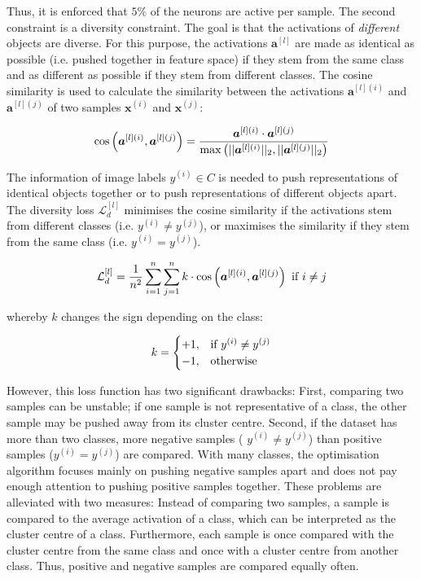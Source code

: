 Thus, it is enforced that $5\%$ of the neurons are active per sample.
The second constraint is a diversity constraint. The goal is that the activations of \emph{different} objects are diverse. For this purpose, the activations $\boldsymbol{a}^{[l]}$ are made as identical as possible (i.e. pushed together in feature space) if they stem from the same class and as different as possible if they stem from different classes.
The cosine similarity is used to calculate the similarity between the activations $\boldsymbol{a}^{[l](i)}$ and $\boldsymbol{a}^{[l](j)}$ of two samples $\boldsymbol{x}^{(i)}$ and $\boldsymbol{x}^{(j)}$:

\begin{align}\eqlbl{vso_5}
		\text{cos}\left( \boldsymbol{a}^{[l](i)}, \boldsymbol{a}^{[l](j)} \right) = \frac{\boldsymbol{a}^{[l](i)} \cdot \boldsymbol{a}^{[l](j)}}{\max \left( ||\boldsymbol{a}^{[l](i)}||_2, ||\boldsymbol{a}^{[l](j)}||_2 \right)}
\end{align}

The information of image labels $y^{(i)} \in C$ is needed to push representations of identical objects together or to push representations of different objects apart.
The diversity loss $\mathcal{L}^{[l]}_d$ minimises the cosine similarity if the activations stem from different classes (i.e. $y^{(i)} \neq y^{(j)}$), or maximises the similarity if they stem from the same class (i.e. $y^{(i)} = y^{(j)}$).

\begin{align}\eqlbl{vso_6}
		\mathcal{L}^{[l]}_{d} = \frac{1}{n^2} \sum_{i=1}^{n} \sum_{j=1}^{n} k \cdot \text{cos} \left( \boldsymbol{a}^{[l](i)}, \boldsymbol{a}^{[l](j)} \right) \text{ if } i \neq j
\end{align}

whereby $k$ changes the sign depending on the class:

\begin{align}\eqlbl{vso_7}
		k = \begin{cases}
      		+1, & \text{if}\ y^{(i)} \neq y^{(j)} \\
      		-1, & \text{otherwise}
    	\end{cases}
\end{align}


However, this loss function has two significant drawbacks: First, comparing two samples can be unstable; if one sample is not representative of a class, the other sample may be pushed away from its cluster centre. Second, if the dataset has more than two classes, more negative samples ( $y^{(i)} \neq y^{(j)}$) than positive samples ($y^{(i)} = y^{(j)}$) are compared. With many classes, the optimisation algorithm focuses mainly on pushing negative samples apart and does not pay enough attention to pushing positive samples together. These problems are alleviated with two measures: Instead of comparing two samples, a sample is compared to the average activation of a class, which can be interpreted as the cluster centre of a class. Furthermore, each sample is once compared with the cluster centre from the same class and once with a cluster centre from another class. Thus, positive and negative samples are compared equally often.

